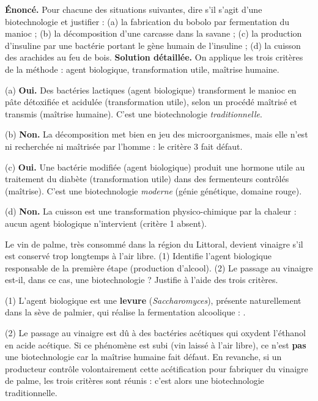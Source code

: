 \documentclass[11pt]{article}
\begin{document}
\begin{exoresolu}
\textbf{Énoncé.} Pour chacune des situations suivantes, dire s'il s'agit d'une biotechnologie et justifier : (a) la fabrication du bobolo par fermentation du manioc ; (b) la décomposition d'une carcasse dans la savane ; (c) la production d'insuline par une bactérie portant le gène humain de l'insuline ; (d) la cuisson des arachides au feu de bois.
\tcblower
\textbf{Solution détaillée.} On applique les trois critères de la méthode : agent biologique, transformation utile, maîtrise humaine.

(a) \textbf{Oui.} Des bactéries lactiques (agent biologique) transforment le manioc en pâte détoxifiée et acidulée (transformation utile), selon un procédé maîtrisé et transmis (maîtrise humaine). C'est une biotechnologie \emph{traditionnelle}.

(b) \textbf{Non.} La décomposition met bien en jeu des microorganismes, mais elle n'est ni recherchée ni maîtrisée par l'homme : le critère 3 fait défaut.

(c) \textbf{Oui.} Une bactérie modifiée (agent biologique) produit une hormone utile au traitement du diabète (transformation utile) dans des fermenteurs contrôlés (maîtrise). C'est une biotechnologie \emph{moderne} (génie génétique, domaine rouge).

(d) \textbf{Non.} La cuisson est une transformation physico-chimique par la chaleur : aucun agent biologique n'intervient (critère 1 absent).
\end{exoresolu}

\begin{exercice}
Le vin de palme, très consommé dans la région du Littoral, devient vinaigre s'il est conservé trop longtemps à l'air libre. (1) Identifie l'agent biologique responsable de la première étape (production d'alcool). (2) Le passage au vinaigre est-il, dans ce cas, une biotechnologie ? Justifie à l'aide des trois critères.
\end{exercice}

\begin{corrige}
(1) L'agent biologique est une \textbf{levure} (\emph{Saccharomyces}), présente naturellement dans la sève de palmier, qui réalise la fermentation alcoolique : .

(2) Le passage au vinaigre est dû à des bactéries acétiques qui oxydent l'éthanol en acide acétique. Si ce phénomène est subi (vin laissé à l'air libre), ce n'est \textbf{pas} une biotechnologie car la maîtrise humaine fait défaut. En revanche, si un producteur contrôle volontairement cette acétification pour fabriquer du vinaigre de palme, les trois critères sont réunis : c'est alors une biotechnologie traditionnelle.
\end{corrige}
\end{document}

